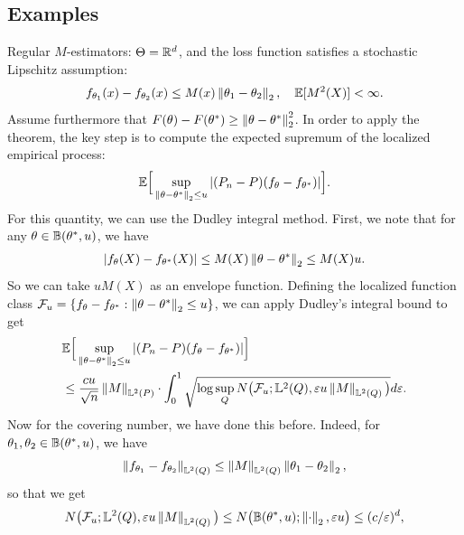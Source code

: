 \documentclass[11pt,letterpaper]{article}
\numberwithin{theorem}{lecture}
\numberwithin{proposition}{lecture}
\numberwithin{lemma}{lecture}
\numberwithin{claim}{lecture}
\numberwithin{corollary}{lecture}
\numberwithin{definition}{lecture}
\numberwithin{conjecture}{lecture}
\numberwithin{remark}{lecture}
\numberwithin{example}{lecture}
\numberwithin{equation}{lecture}
\begin{document}
\subsection{Examples}
Regular $M$-estimators: $\Theta = \mathbb{R}^d$, and the loss function satisfies a stochastic Lipschitz assumption:
\begin{align*}
  f_{\theta_1} (x) - f_{\theta_2} (x) \leq M(x) \left\| \theta_1 - \theta_2\right\|_{2}, \quad {\mathbb{E}}[M^2 (X)] < \infty.
\end{align*}
Assume furthermore that $F (\theta) - F({\theta^*}) \geq \left\| \theta - {\theta^*}\right\|_{2}^2$. In order to apply the theorem, the key step is to compute the expected supremum of the localized empirical process:
\begin{align*}
  {\mathbb{E}} \Big[ \sup_{\left\| \theta - {\theta^*}\right\|_{2} \leq u} |(P_n - P) (f_\theta - f_{{\theta^*}})| \Big].
\end{align*}
For this quantity, we can use the Dudley integral method. First, we note that for any $\theta \in \mathbb{B} ({\theta^*}, u)$, we have
\begin{align*}
   | f_\theta (X) - f_{{\theta^*}} (X)| \leq M (X) \left\| \theta - {\theta^*}\right\|_{2} \leq M(X) u.
\end{align*}
So we can take $u M(X)$ as an envelope function. Defining the localized function class $\mathcal{F}_u = \{f_\theta - f_{{\theta^*}}: \left\| \theta - {\theta^*}\right\|_{2} \leq u\}$, we can apply Dudley's integral bound to get
\begin{align*}
  &{\mathbb{E}} \Big[ \sup_{\left\| \theta - {\theta^*}\right\|_{2} \leq u} |(P_n - P) (f_\theta - f_{{\theta^*}})| \Big] \\
  &\leq \frac{c u}{\sqrt{n}} \left\| M\right\|_{\mathbb{L}^2 (P)} \cdot \int_0^1 \sqrt{\log \sup_{Q} N \big(\mathcal{F}_u; \mathbb{L}^2 (Q),  \varepsilon u \left\| M\right\|_{\mathbb{L}^2 (Q)} \big)} d \varepsilon.
\end{align*}
Now for the covering number, we have done this before. Indeed, for $\theta_1, \theta_2 \in \mathbb{B} ({\theta^*}, u)$, we have
\begin{align*}
  \left\| f_{\theta_1} - f_{\theta_2}\right\|_{\mathbb{L}^2 (Q)} \leq \left\| M\right\|_{\mathbb{L}^2 (Q)} \left\| \theta_1 - \theta_2\right\|_{2},
\end{align*}
so that we get
\begin{align*}
  N \big(\mathcal{F}_u; \mathbb{L}^2 (Q),  \varepsilon u \left\| M\right\|_{\mathbb{L}^2 (Q)} \big) \leq N \big( \mathbb{B}({\theta^*}, u); \left\| \cdot\right\|_{2}, \varepsilon u \big) \leq (c / \varepsilon)^d,
\end{align*}
\end{document}
